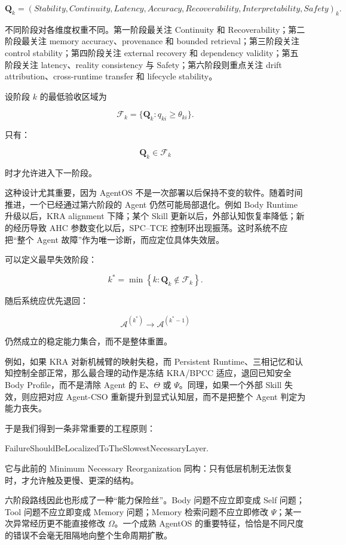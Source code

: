 \[
\mathbf Q_k
=
(
Stability,
Continuity,
Latency,
Accuracy,
Recoverability,
Interpretability,
Safety
)_k.
\]

不同阶段对各维度权重不同。第一阶段最关注 Continuity 和 Recoverability；第二阶段最关注 memory accuracy、provenance 和 bounded retrieval；第三阶段关注 control stability；第四阶段关注 external recovery 和 dependency validity；第五阶段关注 latency、reality consistency 与 Safety；第六阶段则重点关注 drift attribution、cross-runtime transfer 和 lifecycle stability。

设阶段 \(k\) 的最低验收区域为

\[
\mathcal F_k
=
\{
\mathbf Q_k:
q_{ki}\geq\theta_{ki}
\}.
\]

只有：

\[
\mathbf Q_k\in\mathcal F_k
\]

时才允许进入下一阶段。

这种设计尤其重要，因为 AgentOS 不是一次部署以后保持不变的软件。随着时间推进，一个已经通过第六阶段的 Agent 仍然可能局部退化。例如 Body Runtime 升级以后，KRA alignment 下降；某个 Skill 更新以后，外部认知恢复率降低；新的经历导致 AHC 参数变化以后，SPC--TCE 控制环出现振荡。这时系统不应把“整个 Agent 故障”作为唯一诊断，而应定位具体失效层。

可以定义最早失效阶段：

\[
k^\ast
=
\min
\left\{
k:
\mathbf Q_k
\notin
\mathcal F_k
\right\}.
\]

随后系统应优先退回：

\[
\mathcal A^{(k^\ast)}
\rightarrow
\mathcal A^{(k^\ast-1)}
\]

仍然成立的稳定能力集合，而不是整体重置。

例如，如果 KRA 对新机械臂的映射失稳，而 Persistent Runtime、三相记忆和认知控制全部正常，那么最合理的动作是冻结 KRA/BPCC 适应，退回已知安全 Body Profile，而不是清除 Agent 的 E、\(\Theta\) 或 \(\Psi\)。同理，如果一个外部 Skill 失效，则应把对应 Agent-CSO 重新提升到显式认知层，而不是把整个 Agent 判定为能力丧失。

于是我们得到一条非常重要的工程原则：

\begin{statementbox}
FailureShouldBeLocalizedToTheSlowestNecessaryLayer.
\end{statementbox}

它与此前的 Minimum Necessary Reorganization 同构：只有低层机制无法恢复时，才允许触及更慢、更深的结构。

六阶段路线因此也形成了一种“能力保险丝”。Body 问题不应立即变成 Self 问题；Tool 问题不应立即变成 Memory 问题；Memory 检索问题不应立即修改 \(\Psi\)；某一次异常经历更不能直接修改 \(\Omega\)。一个成熟 AgentOS 的重要特征，恰恰是不同尺度的错误不会毫无阻隔地向整个生命周期扩散。

